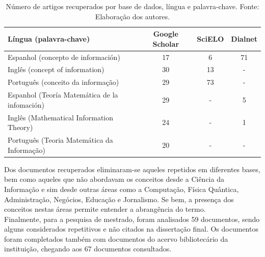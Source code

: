 \documentclass[a4paper,11pt]{article}
\begin{document}
\begin{table}[h]
\begin{center}
\begin{tabular}{| l | c | c | c |}
\hline
\textbf{Língua (palavra-chave)}               & \textbf{Google Scholar} & \multicolumn{1}{l|}{\textbf{SciELO}} & \multicolumn{1}{l|}{{\color[HTML]{000000} \textbf{Dialnet}}} \\ 
\hline \hline
Espanhol (concepto de información)            & 17                      & 6                                    & 71                                                           \\ \hline
Inglês (concept of information)               & 30                      & 13                                   & -                                                            \\ \hline
Português (conceito da informação)            & 29                      & 73                                   & -                                                            \\ \hline
Espanhol (Teoría Matemática de la infomación) & 29                      & -                                    & 5                                                            \\ \hline
Inglês (Mathematical Information Theory)      & 24                      & -                                    & 1                                                            \\ \hline
Português (Teoria Matemática da Informação)   & 20                      & -                                    & -                                                         \\ \hline
\end{tabular}
\caption{Número de artigos recuperados por base de dados, língua e palavra-chave. Fonte: Elaboração dos autores.}
\label{tabla:uno}
\end{center}
\end{table}

Dos documentos recuperados eliminaram-se aqueles repetidos em diferentes bases,
bem como aqueles que não abordavam os conceitos desde a Ciência da Informação e sim
desde outras áreas como a Computação, Física Quântica, Administração, Negócios, Educação
e Jornalismo. Se bem, a presença dos conceitos nestas áreas permite entender a abrangência
do termo. \\
Finalmente, para a pesquisa de mestrado, foram analisados 59 documentos, sendo
alguns considerados repetitivos e não citados na dissertação final. Os documentos foram
completados também com documentos do acervo bibliotecário da instituição, chegando aos
67 documentos consultados.\\
\end{document}
